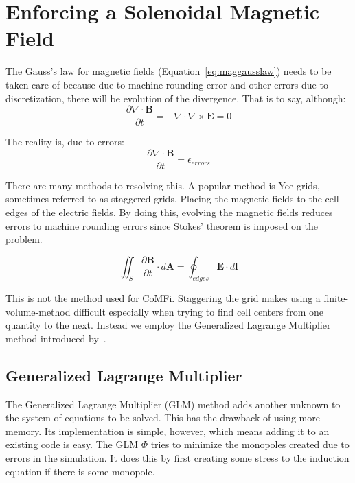 \documentclass[12pt,upcase]{umlthesis}
\begin{document}
\section{Enforcing a Solenoidal Magnetic Field}\label{sec:divergencefree}

The Gauss's law for magnetic fields (Equation~\ref{eq:maggausslaw}) needs to be taken care of because due to machine rounding error and other errors due to discretization, there will be evolution of the divergence. That is to say, although:
\begin{equation}
	\frac{\partial\nabla\cdot\textbf{B}}{\partial t} = -\nabla\cdot\nabla\times\textbf{E} = 0
\end{equation}

The reality is, due to errors:
\begin{equation}
	\frac{\partial\nabla\cdot\textbf{B}}{\partial t} = \epsilon_{errors}
\end{equation}

There are many methods to resolving this. A popular method is Yee grids, sometimes referred to as staggered grids. Placing the magnetic fields to the cell edges of the electric fields. By doing this, evolving the magnetic fields reduces errors to machine rounding errors since Stokes' theorem is imposed on the problem.

\begin{equation}\label{eq:stokesyee}
	\iint_S\frac{\partial\textbf{B}}{\partial t}\cdot d\textbf{A} = {\oint}_{edges} \textbf{E}\cdot d\textbf{l}
\end{equation}

This is not the method used for CoMFi. Staggering the grid makes using a finite-volume-method difficult especially when trying to find cell centers from one quantity to the next. Instead we employ the Generalized Lagrange Multiplier method introduced by~\citet{glm}.

\subsection{Generalized Lagrange Multiplier}

The Generalized Lagrange Multiplier (GLM) method adds another unknown to the system of equations to be solved. This has the drawback of using more memory. Its implementation is simple, however, which means adding it to an existing code is easy. The GLM $\Phi$ tries to minimize the monopoles created due to errors in the simulation. It does this by first creating some stress to the induction equation if there is some monopole.
\end{document}
